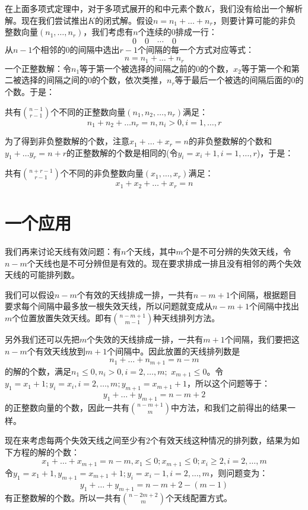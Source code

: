 \documentclass[10pt,a4paper,UTF8]{article}
\begin{document}
在上面多项式定理中，对于多项式展开的和中元素个数\(K\)，我们没有给出一个解析解。现在我们尝试推出\(K\)的闭式解。假设\(n=n_{1} + \ldots + n_{r}\)，则要计算可能的非负整数向量\((n_{1},\ldots ,n_{r})\)，我们考虑有\(n\)个连续的\(0\)排成一行：
\[0\quad 0\quad \cdots \quad 0\]
从\(n-1\)个相邻的\(0\)的间隔中选出\(r-1\)个间隔的每一个方式对应等式：\[n=n_{1} + \ldots + n_{r}\]一个正整数解：令\(n_{1}\)等于第一个被选择的间隔之前的\(0\)的个数，\(x_{2}\)等于第一个和第二被选择的间隔之间的\(0\)的个数，依次类推，\(n_{r}\)等于最后一个被选的间隔后面的\(0\)的个数。于是：
\begin{theorem}
共有\(\binom{n-1}{r-1}\)个不同的正整数向量\((n_{1},n_{2},\ldots ,n_{r})\)满足：
\begin{equation}
\label{eq:6}
n_{1} + n_{2} + \ldots n_{r} = n, n_{i} > 0, i = 1,\ldots ,r
\end{equation}
\end{theorem}
为了得到非负整数解的个数，注意\(x_{1} + \ldots +x_{r} = n\)的非负整数解的个数和\(y_{1}+ \ldots y_{r} = n+r\)的正整数解的个数是相同的(令\(y_{i} = x_{i} + 1,i = 1,\ldots ,r\))，于是：
\begin{theorem}
共有\(\binom{n+r-1}{r-1}\)个不同的非负整数向量\((x_{1},\ldots ,x_{r})\)满足：
\begin{equation}
\label{eq:7}
x_{1} + x_{2} +\ldots + x_{r} = n
\end{equation}
\end{theorem}
\section{一个应用}
\label{sec:orgf74b476}


我们再来讨论天线有效问题：有\(n\)个天线，其中\(m\)个是不可分辨的失效天线，令\(n-m\)个天线也是不可分辨但是有效的。现在要求排成一排且没有相邻的两个失效天线的可能排列数。

我们可以假设\(n-m\)个有效的天线排成一排，一共有\(n-m+1\)个间隔，根据题目要求每个间隔中最多放一根失效天线，所以问题就变成从\(n-m+1\)个间隔中找出\(m\)个位置放置失效天线。即有\(\binom{n-m+1}{m-1}\)种天线排列方法。

另外我们还可以先把\(m\)个失效的天线排成一排，一共有\(m+1\)个间隔，我们要把这\(n-m\)个有效天线放到\(m+1\)个间隔中。因此放置的天线排列数是\[n_{1} + \ldots + n_{m+1} = n-m\]的解的个数，满足\(n_{1} \leq 0, n_{i} > 0, i=2,\ldots ,m;\) \(x_{m+1} \leq 0\)。令\(y_{1} = x_{1} + 1;y_{i} = x_{i},i=2,\ldots ,m;y_{m+1} = x_{m+1} + 1\)，所以这个问题等于：
\begin{equation}
\label{eq:8}
y_{1} + \ldots + y_{m+1} = n-m+2
\end{equation}
的正整数向量的个数，因此一共有\(\binom{n-m+1}{m}\)中方法，和我们之前得出的结果一样。

现在来考虑每两个失效天线之间至少有\(2\)个有效天线这种情况的排列数，结果为如下方程的解的个数：
\[x_{1} + \ldots + x_{m+1} = n-m,x_{1}\leq 0 ;x_{m+1}\leq 0 ;x_{i}\geq 2,i=2,\ldots ,m\]
令\(y_{1} = x_{1} + 1,y_{m+1} = x_{m+1} + 1;y_{i} = x_{i}-1,i=2,\ldots ,m\)，则问题变为：
\[y_{1} + \ldots + y_{m+1} = n-m +2 -  (m-1)\]
有正整数解的个数。所以一共有\(\binom{n-2m +2}{m}\)个天线配置方式。
\end{document}
